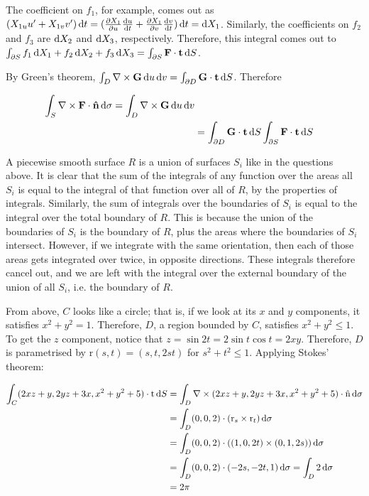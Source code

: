 The coefficient on $f_1$, for example, comes out as $(X_{1u}u^{\prime} + X_{1v}v^{\prime})\mathop{}\!\mathrm{d} t = (\frac{\partial X_1}{\partial u}\frac{\mathop{}\!\mathrm{d} u}{\mathop{}\!\mathrm{d} t} + \frac{\partial X_1}{\partial v}\frac{\mathop{}\!\mathrm{d} v}{\mathop{}\!\mathrm{d} t})\mathop{}\!\mathrm{d} t = \mathop{}\!\mathrm{d} X_1$. Similarly, the coefficients on $f_2$ and $f_3$ are $\mathop{}\!\mathrm{d} X_2$ and $\mathop{}\!\mathrm{d} X_3$, respectively. Therefore, this integral comes out to $\int_{\partial S} f_1 \mathop{}\!\mathrm{d} X_1 + f_2 \mathop{}\!\mathrm{d} X_2 + f_3 \mathop{}\!\mathrm{d} X_3 = \int_{\partial S} \mathbf{F} \cdot \mathbf{t} \mathop{}\!\mathrm{d} S$.

By Green's theorem, $\int_D \nabla \times \mathbf{G} \mathop{}\!\mathrm{d} u \mathop{}\!\mathrm{d} v = \int_{\partial D} \mathbf{G} \cdot \mathbf{t} \mathop{}\!\mathrm{d} S$. Therefore

\begin{align*}
  \int_S \nabla \times \mathbf{F} \cdot \mathbf{\hat{n}} \mathop{}\!\mathrm{d} \sigma = \int_D \nabla \times \mathbf{G} \mathop{}\!\mathrm{d} u \mathop{}\!\mathrm{d} v \\
  &= \int_{\partial D} \mathbf{G} \cdot \mathbf{t} \mathop{}\!\mathrm{d} S \int_{\partial S} \mathbf{F} \cdot \mathbf{t} \mathop{}\!\mathrm{d} S
\end{align*}

A piecewise smooth surface $R$ is a union of surfaces $S_i$ like in the questions above. It is clear that the sum of the integrals of any function over the areas all $S_i$ is equal to the integral of that function over all of $R$, by the properties of integrals. Similarly, the sum of integrals over the boundaries of $S_i$ is equal to the integral over the total boundary of $R$. This is because the union of the boundaries of $S_i$ is the boundary of $R$, plus the areas where the boundaries of $S_i$ intersect. However, if we integrate with the same orientation, then each of those areas gets integrated over twice, in opposite directions. These integrals therefore cancel out, and we are left with the integral over the external boundary of the union of all $S_i$, i.e. the boundary of $R$.

From above, $C$ looks like a circle; that is, if we look at its $x$ and $y$ components, it satisfies $x^2 + y^2 = 1$. Therefore, $D$, a region bounded by $C$, satisfies $x^2 + y^2 \leq 1$. To get the $z$ component, notice that $z = \sin 2t = 2\sin t \cos t = 2xy$. Therefore, $D$ is parametrised by $\mathrm{r}(s, t) = (s, t, 2st)$ for $s^2 + t^2 \leq 1$. Applying Stokes' theorem:

\begin{align*}
  \int_C (2xz + y, 2yz + 3x, x^2 + y^2 + 5) \cdot \mathrm{t} \mathop{}\!\mathrm{d} S &= \int_D \nabla \times (2xz + y, 2yz + 3x, x^2 + y^2 + 5) \cdot \mathrm{\hat{n}} \mathop{}\!\mathrm{d} \sigma \\
  &= \int_D (0, 0, 2) \cdot (\mathrm{r}_s \times \mathrm{r}_t) \mathop{}\!\mathrm{d} \sigma \\
  &= \int_D (0, 0, 2) \cdot ((1, 0, 2t) \times (0, 1, 2s)) \mathop{}\!\mathrm{d} \sigma \\
  &= \int_D (0, 0, 2) \cdot (-2s, -2t, 1) \mathop{}\!\mathrm{d} \sigma = \int_D 2 \mathop{}\!\mathrm{d} \sigma \\
  &= 2\pi
\end{align*}


